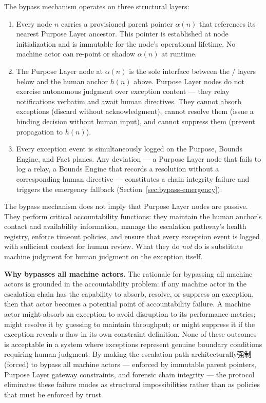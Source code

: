 The bypass mechanism operates on three structural layers:

\begin{enumerate}
\item[\textbf{Immutable parent pointers.}] Every node $n$ carries a provisioned parent pointer $\alpha(n)$ that references its nearest Purpose Layer ancestor. This pointer is established at node initialization and is immutable for the node's operational lifetime. No machine actor can re-point or shadow $\alpha(n)$ at runtime.

\item[\textbf{Purpose Layer gateway enforcement.}] The Purpose Layer node at $\alpha(n)$ is the sole interface between the \bounds{}/\fact{} layers below and the human anchor $h(n)$ above. Purpose Layer nodes do not exercise autonomous judgment over exception content — they relay notifications verbatim and await human directives. They cannot absorb exceptions (discard without acknowledgment), cannot resolve them (issue a binding decision without human input), and cannot suppress them (prevent propagation to $h(n)$).

\item[\textbf{Forensic Ledger chain integrity.}] Every exception event is simultaneously logged on the Purpose, Bounds Engine, and Fact planes. Any deviation — a Purpose Layer node that fails to log a relay, a Bounds Engine that records a resolution without a corresponding human directive — constitutes a chain integrity failure and triggers the emergency fallback (Section~\ref{sec:bypass-emergency}).
\end{enumerate}

\begin{note}
The bypass mechanism does not imply that Purpose Layer nodes are passive. They perform critical accountability functions: they maintain the human anchor's contact and availability information, manage the escalation pathway's health registry, enforce timeout policies, and ensure that every exception event is logged with sufficient context for human review. What they do \emph{not} do is substitute machine judgment for human judgment on the exception itself.
\end{note}

\bigskip
\noindent\textbf{Why bypasses all machine actors.} The rationale for bypassing all machine actors is grounded in the accountability problem: if any machine actor in the escalation chain has the capability to absorb, resolve, or suppress an exception, then that actor becomes a potential point of accountability failure. A machine actor might absorb an exception to avoid disruption to its performance metrics; might resolve it by guessing to maintain throughput; or might suppress it if the exception reveals a flaw in its own constraint definition. None of these outcomes is acceptable in a system where exceptions represent genuine boundary conditions requiring human judgment. By making the escalation path architecturally强制 (forced) to bypass all machine actors — enforced by immutable parent pointers, Purpose Layer gateway constraints, and forensic chain integrity — the protocol eliminates these failure modes as structural impossibilities rather than as policies that must be enforced by trust.

